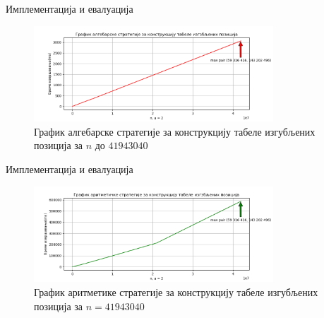 \documentclass[10pt]{beamer}
\theoremstyle{remark}
\theoremstyle{definition}
\begin{document}
\begin{frame}{Имплементација и евалуација}
	
	\begin{figure}
		\centering
		\includegraphics[width=0.8\textwidth]{../src/statistics/picture/algebraic.png}
		\caption{График алгебарске стратегије за конструкцију табеле изгубљених позиција за $ n $ до $ 41943040 $}
	\end{figure}
	
\end{frame}

\begin{frame}{Имплементација и евалуација}
	
	\begin{figure}
		\centering
		\includegraphics[width=0.8\textwidth]{../src/statistics/picture/arithmetic.png}
		\caption{График аритметике стратегије за конструкцију табеле изгубљених позиција за $ n = 41943040 $}
	\end{figure}
	
\end{frame}
\end{document}
